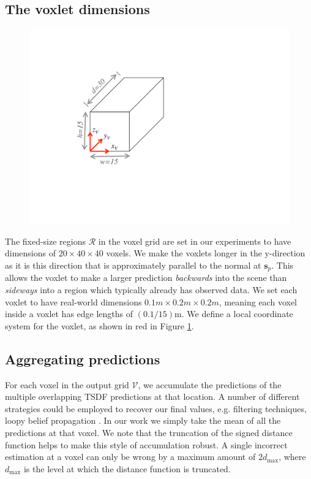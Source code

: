 \documentclass[10pt,twocolumn,letterpaper]{article}
\makeatletter
\renewcommand*{\eg}{e.g.\@\xspace}
\newcommand{\pixelidx}{\mathbf{s}}
\newcommand{\voxelgrid}{\mathcal{V}}
\makeatother
\begin{document}
\subsection{The voxlet dimensions}
\begin{figure}
  \vspace{-30pt}
  \centering
    \includegraphics[width=0.40\columnwidth, clip=true, trim=160 180 440 120]{single_voxlet}
    \vspace{-15pt}
  \caption{}%
    \label{fig:voxlet_dims}
\end{figure}
The fixed-size regions $\mathcal{R}$ in the voxel grid are set in our experiments to have dimensions of $20 \times 40 \times 40$ voxels.
We make the voxlets longer in the y-direction as it is this direction that is approximately parallel to the normal at $\pixelidx_p$.
This allows the voxlet to make a larger prediction \emph{backwards} into the scene than \emph{sideways} into a region which typically already has observed data.
We set each voxlet to have real-world dimensions $0.1m \times 0.2m \times 0.2m$, meaning each voxel inside a voxlet has edge lengths of $(0.1 / 15)$m.
We define a local coordinate system for the voxlet, as shown in red in Figure \ref{fig:voxlet_dims}.



\subsection{Aggregating predictions}
\label{sec:combining}

For each voxel in the output grid $\voxelgrid$, we accumulate the predictions of the multiple overlapping TSDF predictions at that location.
A number of different strategies could be employed to recover our final values, \eg filtering techniques, loopy belief propagation \etc.
In our work we simply take the mean of all the predictions at that voxel.
We note that the truncation of the signed distance function helps to make this style of accumulation robust.
A single incorrect estimation at a voxel can only be wrong by a maximum amount of $2d_{\max}$, where $d_{\max}$ is the level at which the distance function is truncated.
\end{document}
